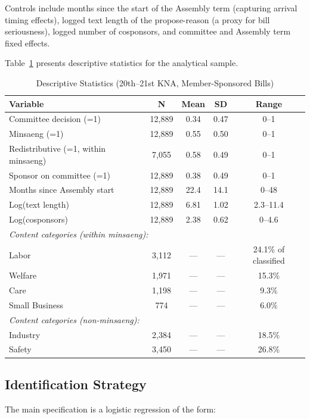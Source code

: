 \documentclass[11pt]{article}
\begin{document}
Controls include months since the start of the Assembly term (capturing arrival timing effects), logged text length of the propose-reason (a proxy for bill seriousness), logged number of cosponsors, and committee and Assembly term fixed effects.

Table~\ref{tab:desc} presents descriptive statistics for the analytical sample.

\begin{table}[H]
\centering
\caption{Descriptive Statistics (20th--21st KNA, Member-Sponsored Bills)}
\label{tab:desc}
\begin{tabular}{lcccc}
\toprule
Variable & N & Mean & SD & Range \\
\midrule
Committee decision (=1) & 12,889 & 0.34 & 0.47 & 0--1 \\
Minsaeng (=1) & 12,889 & 0.55 & 0.50 & 0--1 \\
Redistributive (=1, within minsaeng) & 7,055 & 0.58 & 0.49 & 0--1 \\
Sponsor on committee (=1) & 12,889 & 0.38 & 0.49 & 0--1 \\
Months since Assembly start & 12,889 & 22.4 & 14.1 & 0--48 \\
Log(text length) & 12,889 & 6.81 & 1.02 & 2.3--11.4 \\
Log(cosponsors) & 12,889 & 2.38 & 0.62 & 0--4.6 \\
\midrule
\multicolumn{5}{l}{\textit{Content categories (within minsaeng):}} \\
\quad Labor & 3,112 & --- & --- & 24.1\% of classified \\
\quad Welfare & 1,971 & --- & --- & 15.3\% \\
\quad Care & 1,198 & --- & --- & 9.3\% \\
\quad Small Business & 774 & --- & --- & 6.0\% \\
\midrule
\multicolumn{5}{l}{\textit{Content categories (non-minsaeng):}} \\
\quad Industry & 2,384 & --- & --- & 18.5\% \\
\quad Safety & 3,450 & --- & --- & 26.8\% \\
\bottomrule
\end{tabular}
\end{table}


\subsection{Identification Strategy}

The main specification is a logistic regression of the form:
\end{document}
